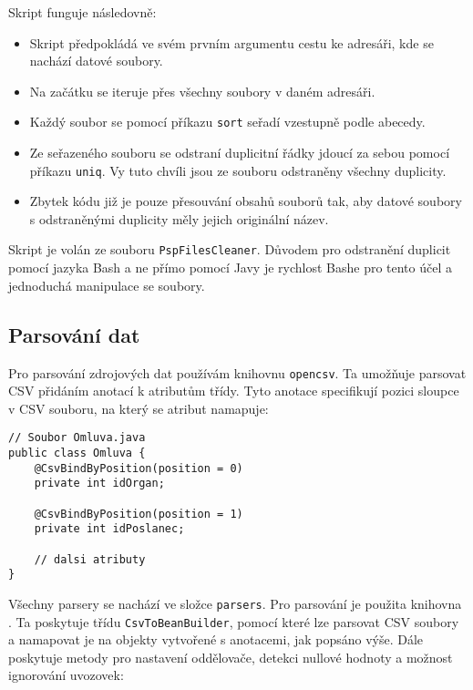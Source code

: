 \noindent Skript funguje následovně:

\begin{itemize}
	\item Skript předpokládá ve svém prvním argumentu cestu ke adresáři, kde se nachází datové soubory.
	
	\item Na začátku se iteruje přes všechny soubory v daném adresáři.
	
	\item Každý soubor se pomocí příkazu \lstinline|sort| seřadí vzestupně podle abecedy.
	
	\item Ze seřazeného souboru se odstraní duplicitní řádky jdoucí za sebou pomocí příkazu \lstinline|uniq|. Vy tuto chvíli jsou ze souboru odstraněny všechny duplicity.
	
	\item Zbytek kódu již je pouze přesouvání obsahů souborů tak, aby datové soubory s odstraněnými duplicity měly jejich originální název.
\end{itemize}

\noindent Skript je volán ze souboru \lstinline|PspFilesCleaner|. Důvodem pro odstranění duplicit pomocí jazyka Bash a ne přímo pomocí Javy je rychlost Bashe pro tento účel a jednoduchá manipulace se soubory.

\subsection{Parsování dat}
Pro parsování zdrojových dat používám knihovnu \lstinline|opencsv|. Ta umožňuje parsovat CSV přidáním anotací k atributům třídy. Tyto anotace specifikují pozici sloupce v CSV souboru, na který se atribut namapuje:

\begin{lstlisting}[caption={Parsování datového souboru omluvy.unl}, tabsize=2]
// Soubor Omluva.java
public class Omluva {
	@CsvBindByPosition(position = 0)
	private int idOrgan;
	
	@CsvBindByPosition(position = 1)
	private int idPoslanec;

	// dalsi atributy	
}
\end{lstlisting}

\noindent Všechny parsery se nachází ve složce \lstinline|parsers|. Pro parsování je použita knihovna \cite{opencsv}. Ta poskytuje třídu \lstinline|CsvToBeanBuilder|, pomocí které lze parsovat CSV soubory a namapovat je na objekty vytvořené s anotacemi, jak popsáno výše. Dále poskytuje metody pro nastavení oddělovače, detekci nullové hodnoty a možnost ignorování uvozovek:

